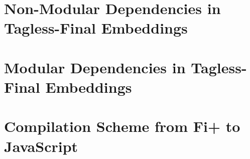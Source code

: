 \chapter{Non-Modular Dependencies in Tagless-Final Embeddings} \label{sec:tagless}


\chapter{Modular Dependencies in Tagless-Final Embeddings} \label{sec:fancier}


\chapter{Compilation Scheme from Fi+ to JavaScript}
